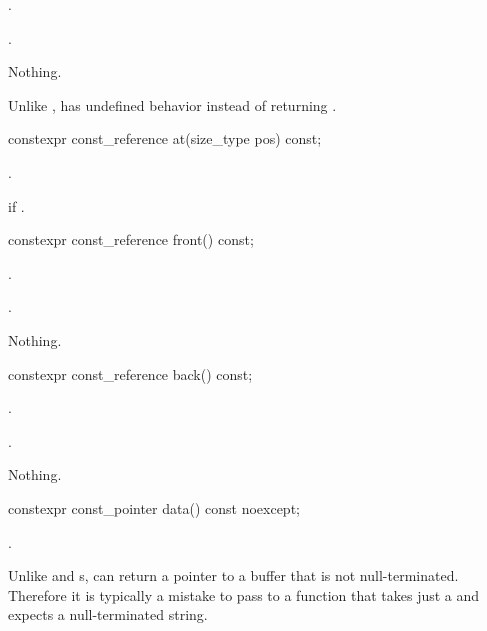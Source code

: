 \begin{itemdescr}
\pnum
\expects
{}.

\pnum
\returns
{}.

\pnum
\throws
Nothing.

\pnum
\begin{note}
Unlike ,
 has undefined behavior instead of returning .
\end{note}
\end{itemdescr}

%
\begin{itemdecl}
constexpr const_reference at(size_type pos) const;
\end{itemdecl}

\begin{itemdescr}
\pnum
\returns
{}.

\pnum
\throws
{} if .
\end{itemdescr}

%
\begin{itemdecl}
constexpr const_reference front() const;
\end{itemdecl}

\begin{itemdescr}
\pnum
\expects
{}.

\pnum
\returns
{}.

\pnum
\throws
Nothing.
\end{itemdescr}

%
\begin{itemdecl}
constexpr const_reference back() const;
\end{itemdecl}

\begin{itemdescr}
\pnum
\expects
{}.

\pnum
\returns
{}.

\pnum
\throws
Nothing.
\end{itemdescr}

%
\begin{itemdecl}
constexpr const_pointer data() const noexcept;
\end{itemdecl}

\begin{itemdescr}
\pnum
\returns
{}.

\pnum
\begin{note}
Unlike  and s,
 can return a pointer to a buffer that is not null-terminated.
Therefore it is typically a mistake to pass  to a function that takes just a  and expects a null-terminated string.
\end{note}
\end{itemdescr}

